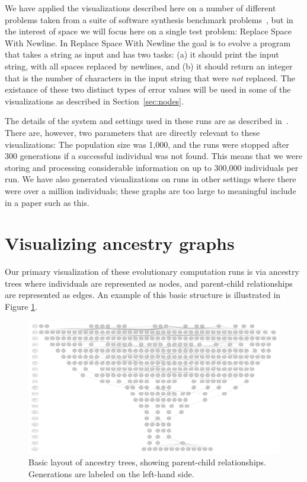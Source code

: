 \documentclass{sig-alternate}
\begin{document}
We have applied the visualizations described here on a 
number of different problems taken from a suite of software synthesis benchmark 
problems~\cite{Helmuth:2015:GECCO}, but in the interest of space we
will focus here on a single test problem: Replace Space With Newline.
In Replace Space With Newline the goal is to evolve a program that takes a string
as input and has two tasks: (a) it should print the input string, with all spaces
replaced by newlines, and (b) it should return an integer that is the number of
characters in the input string that were \emph{not} replaced. The existance of
these two distinct types of error values will be used in some of the visualizations
as described in Section~\ref{sec:nodes}. 

The details of the system and settings used in these runs are as described 
in~\cite{Helmuth:2015:GECCO}. There are, however, two parameters that are 
directly relevant to these visualizations: The population size was 1,000, and the runs were stopped after 300 generations if a successful individual was not 
found. This means that we were storing and processing considerable information
on up to 300,000 individuals per run. We have also generated visualizations on runs
in other settings where there were over a million individuals; these graphs are too
large to meaningful include in a paper such as this.

\section{Visualizing ancestry graphs}
\label{sec:basics}

Our primary visualization of these evolutionary computation runs is via ancestry trees
where individuals are represented as nodes, and parent-child relationships are 
represented as edges. An example of this basic structure is illustrated in 
Figure \ref{fig:lexRun0Basic}. 

\begin{figure}
	\begin{center}
		\includegraphics[width=\linewidth]{../Figures/run0_basic_structure.pdf}
	\end{center}
	\caption{Basic layout of ancestry trees, showing parent-child relationships. Generations are labeled on the left-hand side.}
	\label{fig:lexRun0Basic}
\end{figure}
\end{document}
